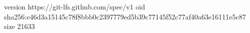 version https://git-lfs.github.com/spec/v1
oid sha256:e46d3a15145c78f8bbb0c2397779ed5b39c77145f52c77af40a63e16111e5c87
size 21633
